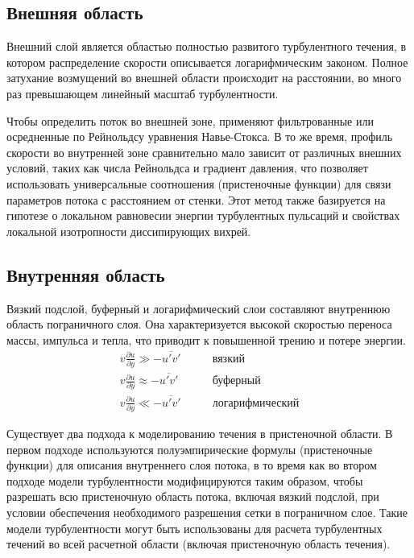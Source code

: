 \subsection{Внешняя область}

	Внешний слой является областью полностью развитого турбулентного течения, в котором распределение скорости описывается логарифмическим законом. Полное затухание возмущений во внешней области происходит на расстоянии, во много раз превышающем линейный масштаб турбулентности.
	
	Чтобы определить поток во внешней зоне, применяют фильтрованные или осредненные по Рейнольдсу уравнения Навье-Стокса. В то же время, профиль скорости во внутренней зоне сравнительно мало зависит от различных внешних условий, таких как числа Рейнольдса и градиент давления, что позволяет использовать универсальные соотношения (пристеночные функции) для связи параметров потока с расстоянием от стенки. Этот метод также базируется на гипотезе о локальном равновесии энергии турбулентных пульсаций и свойствах локальной изотропности диссипирующих вихрей\cite{Волков2005}.

\subsection{Внутренняя область}

	Вязкий подслой, буферный и логарифмический слои составляют внутреннюю область пограничного слоя. Она характеризуется высокой скоростью переноса массы, импульса и тепла, что приводит к повышенной трению и потере энергии.
	\begin{align}
		v\frac{\partial u}{\partial y} \gg -\overline{u'v'} & \qquad\text{вязкий}\nonumber \\
		v\frac{\partial u}{\partial y} \approx -\overline{u'v'} & \qquad\text{буферный}\nonumber \\
		v\frac{\partial u}{\partial y} \ll -\overline{u'v'} & \qquad\text{логарифмический}
	\end{align}
	
	Существует два подхода к моделированию течения в пристеночной области. В первом подходе используются полуэмпирические формулы (пристеночные функции) для описания внутреннего слоя потока, в то время как во втором подходе модели турбулентности модифицируются таким образом, чтобы разрешать всю пристеночную область потока, включая вязкий подслой, при условии обеспечения необходимого разрешения сетки в пограничном слое. Такие модели турбулентности могут быть использованы для расчета турбулентных течений во всей расчетной области (включая пристеночную область течения).

